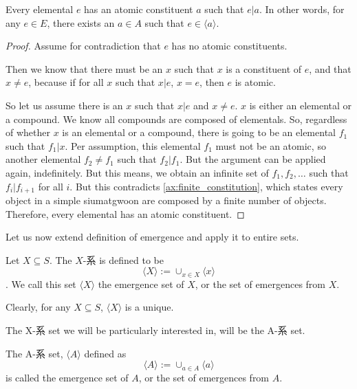 \begin{lemma}\label{lem:every-elemental-has-an-atomic-constituent}
    Every elemental $e$ has an atomic constituent $a$ such that $e|a$. In other words, for any $e \in E$, there exists an $a \in A$ such that $e \in \langle a \rangle$.
\end{lemma}
\begin{proof}
    Assume for contradiction that $e$ has no atomic constituents. 

    Then we know that there must be an $x$ such that $x$ is a constituent of $e$, and that $x\neq e$, because if for all $x$ such that $x|e$, $x=e$, then $e$ is atomic. 

    So let us assume there is an $x$ such that $x|e$ and $x\neq e$. $x$ is either an elemental or a compound. We know all compounds are composed of elementals. So, regardless of whether $x$ is an elemental or a compound, there is going to be an elemental $f_1$ such that $f_1|x$. Per assumption, this elemental $f_1$ must not be an atomic, so another elemental $f_2\neq f_1$ such that $f_2|f_1$. But the argument can be applied again, indefinitely. But this means, we obtain an infinite set of $f_1, f_2, \ldots$ such that $f_i|f_{i+1}$ for all $i$. But this contradicts \ref{ax:finite_constitution}, which states every object in a simple siumatgwoon are composed by a finite number of objects. Therefore, every elemental has an atomic constituent.
\end{proof}




Let us now extend definition of emergence and apply it to entire sets. 
    
\begin{definition}[X-系]\label{def:hais-of-sets}
        Let $X\subseteq S$. The $X$-系 is defined to be $$\langle X \rangle := \cup_{x\in X} \langle x \rangle$$. We call this set  $\langle X \rangle$ the emergence set of $X$, or the set of emergences from $X$.
\end{definition}

Clearly, for any $X\subseteq S$, $\langle X \rangle$ is a unique.

The X-系 set we will be particularly interested in, will be the A-系 set. 

\begin{axiom}\label{ax:the emergence-set-of-A}
    The A-系 set, $\langle A \rangle$ defined as
     $$\langle A \rangle := \cup_{a\in A} \langle a \rangle$$ 
     is called the emergence set of $A$, or the set of emergences from $A$. 
\end{axiom}


